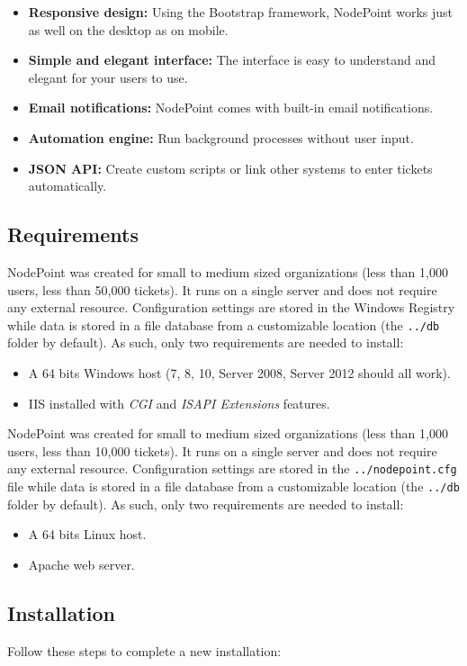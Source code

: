 \documentclass[11pt]{article}
\begin{document}
\begin{itemize}
\item \textbf{Responsive design:} Using the Bootstrap framework, NodePoint works just as well on the desktop as on mobile.
\item \textbf{Simple and elegant interface:} The interface is easy to understand and elegant for your users to use.
\item \textbf{Email notifications:} NodePoint comes with built-in email notifications.
\item \textbf{Automation engine:} Run background processes without user input.
\item \textbf{JSON API:} Create custom scripts or link other systems to enter tickets automatically.
\end{itemize}

\clearpage
\subsection{Requirements}
{
NodePoint was created for small to medium sized organizations (less than 1,000 users, less than 50,000 tickets). It runs on a single server and does not require any external resource. Configuration settings are stored in the Windows Registry while data is stored in a file database from a customizable location (the \texttt{../db} folder by default). As such, only two requirements are needed to install:
\begin{itemize}
\item A 64 bits Windows host (7, 8, 10, Server 2008, Server 2012 should all work).
\item IIS installed with \textit{CGI} and \textit{ISAPI Extensions} features.
\end{itemize}
}
{
NodePoint was created for small to medium sized organizations (less than 1,000 users, less than 10,000 tickets). It runs on a single server and does not require any external resource. Configuration settings are stored in the \texttt{../nodepoint.cfg} file while data is stored in a file database from a customizable location (the \texttt{../db} folder by default). As such, only two requirements are needed to install:
\begin{itemize}
\item A 64 bits Linux host.
\item Apache web server.
\end{itemize}
}

\subsection{Installation}
Follow these steps to complete a new installation:
\end{document}

